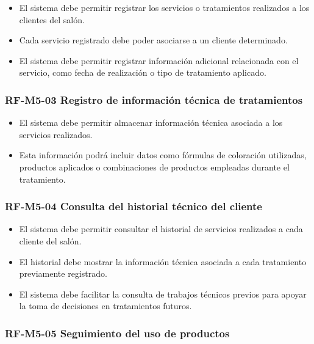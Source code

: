 \begin{itemize}
    \item El sistema debe permitir registrar los servicios o tratamientos realizados a los clientes del salón.
    \item Cada servicio registrado debe poder asociarse a un cliente determinado.
    \item El sistema debe permitir registrar información adicional relacionada con el servicio, como fecha de realización o tipo de tratamiento aplicado.
\end{itemize}

\vspace{-0.75em}
\subsubsection{RF-M5-03 Registro de información técnica de tratamientos}
\vspace{-1em}

\begin{itemize}
    \item El sistema debe permitir almacenar información técnica asociada a los servicios realizados.
    \item Esta información podrá incluir datos como fórmulas de coloración utilizadas, productos aplicados o combinaciones de productos empleadas durante el tratamiento.
\end{itemize}

\vspace{-0.75em}
\subsubsection{RF-M5-04 Consulta del historial técnico del cliente}
\vspace{-1em}

\begin{itemize}
    \item El sistema debe permitir consultar el historial de servicios realizados a cada cliente del salón.
    \item El historial debe mostrar la información técnica asociada a cada tratamiento previamente registrado.
    \item El sistema debe facilitar la consulta de trabajos técnicos previos para apoyar la toma de decisiones en tratamientos futuros.
\end{itemize}

\vspace{-0.75em}
\subsubsection{RF-M5-05 Seguimiento del uso de productos}
\vspace{-1em}

